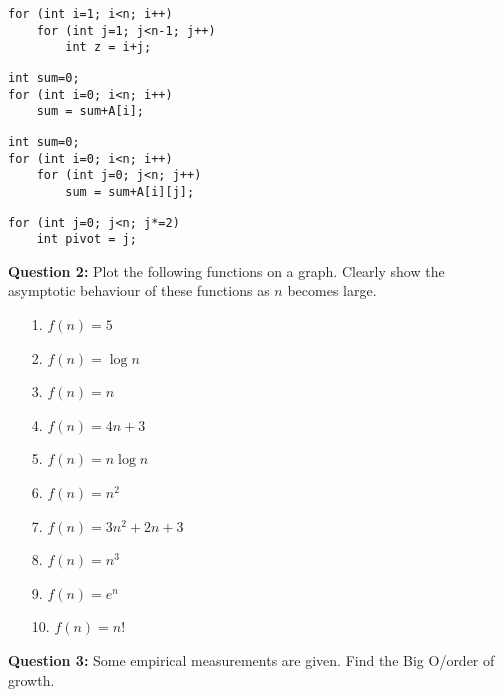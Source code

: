 \documentclass[12pt,a4paper]{article}
\begin{document}
\begin{lstlisting}
for (int i=1; i<n; i++)
    for (int j=1; j<n-1; j++)
        int z = i+j;
\end{lstlisting}
\begin{lstlisting}
int sum=0;
for (int i=0; i<n; i++)
    sum = sum+A[i];
\end{lstlisting}
\begin{lstlisting}
int sum=0;
for (int i=0; i<n; i++)
    for (int j=0; j<n; j++)
        sum = sum+A[i][j];
\end{lstlisting}
\begin{lstlisting}
for (int j=0; j<n; j*=2)
    int pivot = j;
\end{lstlisting}
\noindent\textbf{Question 2:} Plot the following functions on a graph. Clearly show the asymptotic behaviour of these functions as $n$ becomes large.
\begin{itemize}
\item[1.] $f(n)=5$
\item[2.] $f(n)=\log n$
\item[3.] $f(n)=n$
\item[4.] $f(n)=4n+3$
\item[5.] $f(n)=n\log n$
\item[6.] $f(n)=n^2$
\item[7.] $f(n)=3n^2+2n+3$
\item[8.] $f(n)=n^3$
\item[9.] $f(n)=e^n$
\item[10.] $f(n)=n!$
\end{itemize}
\noindent\textbf{Question 3:} Some empirical measurements are given. Find the Big O/order of growth.
\end{document}
